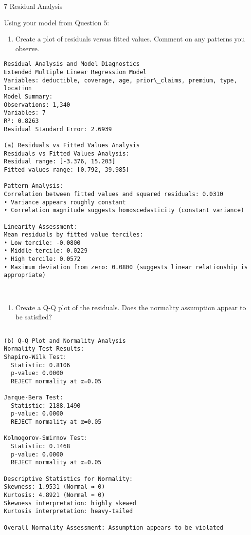 \documentclass[8pt, twocolumn]{extarticle}
\providecommand{\tightlist}{%
      \setlength{\itemsep}{0pt}\setlength{\parskip}{0pt}}
\begin{document}
    7 Residual Analysis

Using your model from Question 5:

    \begin{enumerate}
\def\labelenumi{(\alph{enumi})}
\tightlist
\item
  Create a plot of residuals versus fitted values. Comment on any
  patterns you observe.
\end{enumerate}

    \begin{Verbatim}[commandchars=\\\{\}]
Residual Analysis and Model Diagnostics
Extended Multiple Linear Regression Model
Variables: deductible, coverage, age, prior\_claims, premium, type, location
Model Summary:
Observations: 1,340
Variables: 7
R²: 0.8263
Residual Standard Error: 2.6939

(a) Residuals vs Fitted Values Analysis
Residuals vs Fitted Values Analysis:
Residual range: [-3.376, 15.203]
Fitted values range: [0.792, 39.985]

Pattern Analysis:
Correlation between fitted values and squared residuals: 0.0310
• Variance appears roughly constant
• Correlation magnitude suggests homoscedasticity (constant variance)

Linearity Assessment:
Mean residuals by fitted value terciles:
• Low tercile: -0.0800
• Middle tercile: 0.0229
• High tercile: 0.0572
• Maximum deviation from zero: 0.0800 (suggests linear relationship is
appropriate)
    \end{Verbatim}

    \begin{center}
    \end{center}
    { \hspace*{\fill} \\}
    
    \begin{enumerate}
\def\labelenumi{(\alph{enumi})}
\setcounter{enumi}{1}
\tightlist
\item
  Create a Q-Q plot of the residuals. Does the normality assumption
  appear to be satisfied?
\end{enumerate}

    \begin{Verbatim}[commandchars=\\\{\}]

(b) Q-Q Plot and Normality Analysis
Normality Test Results:
Shapiro-Wilk Test:
  Statistic: 0.8106
  p-value: 0.0000
  REJECT normality at α=0.05

Jarque-Bera Test:
  Statistic: 2188.1490
  p-value: 0.0000
  REJECT normality at α=0.05

Kolmogorov-Smirnov Test:
  Statistic: 0.1468
  p-value: 0.0000
  REJECT normality at α=0.05

Descriptive Statistics for Normality:
Skewness: 1.9531 (Normal ≈ 0)
Kurtosis: 4.8921 (Normal ≈ 0)
Skewness interpretation: highly skewed
Kurtosis interpretation: heavy-tailed

Overall Normality Assessment: Assumption appears to be violated
    \end{Verbatim}
\end{document}
